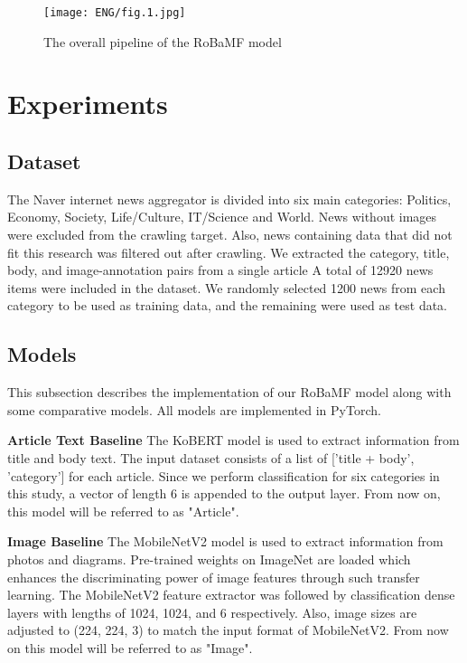 \documentclass{article}
\begin{document}
\begin{figure}[ht]
    \centering
    \texttt{[image: ENG/fig.1.jpg]}
    \caption{The overall pipeline of the RoBaMF model}
    \label{fig.1}
\end{figure}


\section{Experiments}
\subsection{Dataset}
The Naver internet news aggregator is divided into six main categories: Politics, Economy, Society, Life/Culture, IT/Science and World. News without images were excluded from the crawling target. Also, news containing data that did not fit this research was filtered out after crawling.
We extracted the category, title, body, and image-annotation pairs from a single article
A total of 12920 news items were included in the dataset. We randomly selected 1200 news from each category to be used as training data, and the remaining were used as test data.



\subsection{Models}
This subsection describes the implementation of our RoBaMF model along with some comparative models. All models are implemented in PyTorch.




\textbf{Article Text Baseline}\quad
The KoBERT model is used to extract information from title and body text.
The input dataset consists of a list of ['title + body', 'category'] for each article.
Since we perform classification for six categories in this study, a vector of length 6 is appended to the output layer.
From now on, this model will be referred to as "Article".



\textbf{Image Baseline}\quad
The MobileNetV2 model is used to extract information from photos and diagrams.
Pre-trained weights on ImageNet are loaded which enhances the discriminating power of image features through such transfer learning.
The MobileNetV2 feature extractor was followed by classification dense layers with lengths of 1024, 1024, and 6 respectively.
Also, image sizes are adjusted to (224, 224, 3) to match the input format of MobileNetV2. 
From now on this model will be referred to as "Image".
\end{document}
